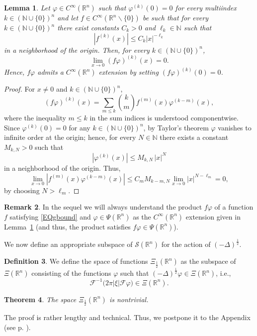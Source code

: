\documentclass[reqno,11pt]{amsart}
\newtheorem{theorem}{Theorem}[section]
\newtheorem{lemma}[theorem]{Lemma}
\theoremstyle{definition}
\newtheorem{definition}[theorem]{Definition}
\newtheorem{remark}[theorem]{Remark}
\def\R{\mathbb{R}}
\begin{document}
\begin{lemma}\label{LEMproduct}
	Let $\varphi\in C^\infty(\R^n)$ such that $\varphi^{(k)}(0)=0$ for every multiindex $k\in (\mathbb{N}\cup\{0\})^n$ and let $f\in C^\infty(\R^n\backslash \{0\})$ be such that for every $k\in (\mathbb{N}\cup\{0\})^n$ there exist constants  $C_k>0$ and $\ell_k\in \mathbb{N}$ such that
	\begin{equation}
		\label{EQgbound}
		|f^{(k)}(x)|\leq C_k |x|^{-\ell_k}
	\end{equation}
	in a neighborhood of the origin. Then, for every $k\in (\mathbb{N}\cup\{0\})^n$,
	\[
	\lim_{x\to 0} (f\varphi)^{(k)}(x)=0.
	\]
	Hence, $f\varphi$ admits a $C^\infty(\R^n)$ extension by setting $(f\varphi)^{(k)}(0)=0$.
\end{lemma}
\begin{proof}
	For $x\neq 0$ and $k\in (\mathbb{N}\cup\{0\})^n$,
	\[
	(f\varphi)^{(k)}(x) = \sum_{m\leq k} \binom{k}{m} f^{(m)}(x)\varphi^{(k-m)}(x),
	\]
	where the inequality  $m\leq k$ in the sum indices is understood componentwise. Since $\varphi^{(k)}(0)=0$ for any $k\in (\mathbb{N}\cup\{0\})^n$,
by Taylor's theorem $\varphi$ vanishes to infinite order at the origin; hence, for every $N\in \mathbb{N}$ there exists a constant $M_{k,N}>0$ such that
	\[
	|\varphi^{(k)}(x)|\leq M_{k,N}\,|x|^{N}
	\]
	in a neighborhood of the origin. Thus,
	\[
	\lim_{x\to 0} |f^{(m)}(x)\varphi^{(k-m)}(x) | \leq  C_m M_{k-m,N}\lim_{x\to 0}|x|^{N-\ell_{m}}=0,
	\]
by choosing $N>\ell_{m}$.
\end{proof}
\begin{remark}\label{REMextension}
	In the sequel we will always understand the product $f\varphi$ of a function $f$ satisfying \eqref{EQgbound} and $\varphi\in \Psi (\R^n)$ as the $C^\infty(\R^n)$ extension given in Lemma~\ref{LEMproduct} (and thus, the product satisfies $f\varphi\in \Psi(\R^n)$).
\end{remark}

We now define an appropriate subspace of $\mathcal{S}(\R^n)$ for the action of $(-\Delta)^{\frac{1}{2}}$.
\begin{definition}
	\label{space}
	We define the space of functions $\Xi_{\frac{1}{2}}(\R^n)$ as the subspace of $\Xi(\R^n)$  consisting of the functions $\varphi$ such that $(-\Delta)^{\frac{1}{2}}\varphi\in \Xi(\R^n)$, i.e.,
	\[
	\mathcal{F}^{-1}\big( 2\pi|\xi| \mathcal{F}\varphi\big)\in \Xi(\R^n).
	\]
\end{definition}

\begin{theorem}\label{THMxirnonempty}
	The space $\Xi_{\frac{1}{2}}(\R^n)$ is nontrivial.
\end{theorem}
The proof is rather lengthy and technical. Thus, we postpone it to the Appendix (see p. \pageref{PAGproofxir}).
\end{document}
